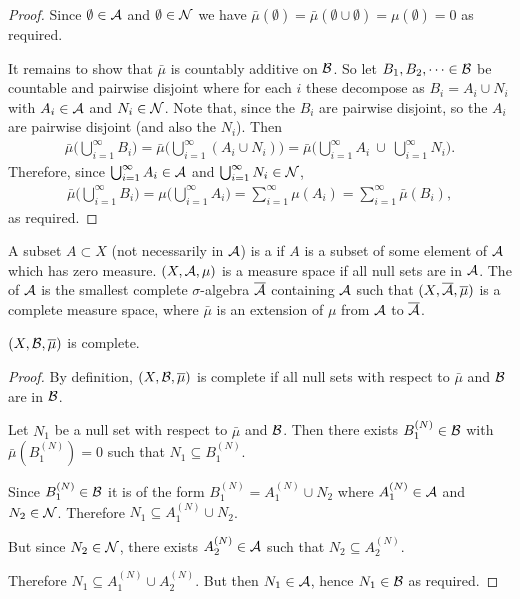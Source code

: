 \begin{proof}
  Since $\emptyset \in \mathcal A$ and $\emptyset \in \mathcal N$ we
  have $\bar\mu(\emptyset) = \bar\mu(\emptyset \cup \emptyset) = \mu(\emptyset) = 0$ as required.

  It remains to show that $\bar\mu$ is countably additive on $\mathcal B$. So let $B_1, B_2, \dots \in \mathcal B$ be
  countable and pairwise disjoint where for each $i$ these decompose as $B_i = A_i \cup N_i$
  with $A_i \in \mathcal A$ and $N_i \in \mathcal N$. Note that, since the $B_i$ are pairwise disjoint, so the $A_i$ are
  pairwise disjoint (and also the $N_i$). Then
  \begin{align*}
    \bar\mu\Big(\bigcup_{i=1}^\infty B_i\Big)
    = \bar\mu\Big(\bigcup_{i=1}^\infty (A_i \cup N_i)\Big)
    = \bar\mu\Big(\bigcup_{i=1}^\infty A_i ~\cup~ \bigcup_{i=1}^\infty N_i\Big).
  \end{align*}
  Therefore, since $\bigcup_{i=1}^\infty A_i \in \mathcal A$ and $\bigcup_{i=1}^\infty N_i \in \mathcal N$,
  \begin{align*}
    \bar\mu\Big(\bigcup_{i=1}^\infty B_i\Big)
    = \mu\Big(\bigcup_{i=1}^\infty A_i\Big)
    = \sum_{i=1}^\infty \mu(A_i)
    = \sum_{i=1}^\infty \bar\mu(B_i),
  \end{align*}
  as required.
\end{proof}



\begin{remark*}
  A subset $A \subset X$ (not necessarily in $\mathcal A$) is a  if $A$ is a subset of some element of
  $\mathcal A$ which has zero measure. $(X, \mathcal A, \mu)$ is a  measure space if all null sets are in
  $\mathcal A$. The  of $\mathcal A$ is the smallest complete $\sigma$-algebra $\overline{\mathcal A}$ containing
  $\mathcal A$ such that $(X, \overline{\mathcal A}, \overline \mu)$ is a complete measure space, where $\bar \mu$ is an extension
  of $\mu$ from $\mathcal A$ to $\overline{\mathcal A}$.
\end{remark*}

\begin{claim*}
  $(X, \mathcal B, \overline{\mu})$ is complete.
\end{claim*}

\begin{proof}
  By definition, $(X, \mathcal B, \overline{\mu})$ is complete if all null sets with respect to $\bar\mu$ and $\mathcal B$ are
  in $\mathcal B$.

  Let $N_1$ be a null set with respect to $\bar\mu$ and $\mathcal B$. Then there exists $B^{(N)}_1 \in \mathcal B$
  with $\bar\mu(B^{(N)}_1) = 0$ such that $N_1 \subseteq B^{(N)}_1$.

  Since $B^{(N)}_1 \in \mathcal B$ it is of the form $B^{(N)}_1 = A^{(N)}_1 \cup N_2$ where $A^{(N)}_1 \in \mathcal A$ and $N_2 \in \mathcal N$. Therefore
  $N_1 \subseteq A^{(N)}_1 \cup N_2$.

  But since $N_2 \in \mathcal N$, there exists $A^{(N)}_2 \in \mathcal A$ such that $N_2 \subseteq A^{(N)}_2$.

  Therefore $N_1 \subseteq A^{(N)}_1 \cup A^{(N)}_2$. But then $N_1 \in \mathcal A$, hence $N_1 \in \mathcal B$ as required.
\end{proof}

